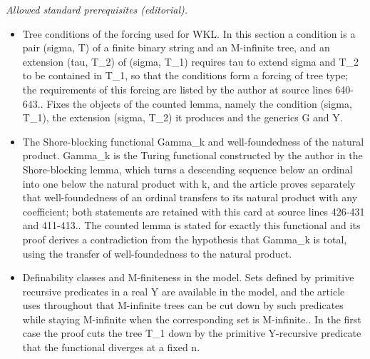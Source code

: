 \documentclass{article}
\numberwithin{theorem}{section}
\newtheorem{lemma}[theorem]{Lemma}
\newcommand{\RCA}{\mathsf{RCA}}
\newcommand{\WF}{\mathsf{WF}}
\newcommand{\M}{\mathcal{M}}
\newcommand{\ntimes}{\dottimes}
\begin{document}
\noindent\textit{Allowed standard prerequisites (editorial).}\begin{itemize}
\item Tree conditions of the forcing used for WKL. In this section a condition is a pair (sigma, T) of a finite binary string and an M-infinite tree, and an extension (tau, T\_2) of (sigma, T\_1) requires tau to extend sigma and T\_2 to be contained in T\_1, so that the conditions form a forcing of tree type; the requirements of this forcing are listed by the author at source lines 640-643.. Fixes the objects of the counted lemma, namely the condition (sigma, T\_1), the extension (sigma, T\_2) it produces and the generics G and Y.
\item The Shore-blocking functional Gamma\_k and well-foundedness of the natural product. Gamma\_k is the Turing functional constructed by the author in the Shore-blocking lemma, which turns a descending sequence below an ordinal into one below the natural product with k, and the article proves separately that well-foundedness of an ordinal transfers to its natural product with any coefficient; both statements are retained with this card at source lines 426-431 and 411-413.. The counted lemma is stated for exactly this functional and its proof derives a contradiction from the hypothesis that Gamma\_k is total, using the transfer of well-foundedness to the natural product.
\item Definability classes and M-finiteness in the model. Sets defined by primitive recursive predicates in a real Y are available in the model, and the article uses throughout that M-infinite trees can be cut down by such predicates while staying M-infinite when the corresponding set is M-infinite.. In the first case the proof cuts the tree T\_1 down by the primitive Y-recursive predicate that the functional diverges at a fixed n.
\end{itemize}\medskip
{}

\end{document}
